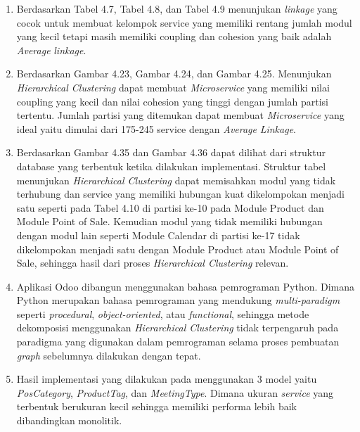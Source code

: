 \begin{enumerate}[nolistsep,leftmargin=0.5cm]
    \item Berdasarkan Tabel 4.7,  Tabel 4.8, dan Tabel 4.9 menunjukan \textit{linkage} yang cocok untuk membuat kelompok service yang memiliki rentang jumlah modul yang kecil tetapi masih memiliki coupling dan cohesion yang baik adalah \textit{Average} \textit{linkage}.
    \item Berdasarkan Gambar 4.23, Gambar 4.24,  dan Gambar 4.25. Menunjukan \textit{Hierarchical Clustering} dapat membuat \textit{Microservice} yang memiliki nilai coupling yang kecil dan nilai cohesion yang tinggi dengan jumlah partisi tertentu. Jumlah partisi yang ditemukan dapat membuat \textit{Microservice} yang ideal yaitu dimulai dari 175-245 service dengan \textit{Average} \textit{Linkage}. 
    \item Berdasarkan Gambar 4.35  dan Gambar 4.36 dapat dilihat dari struktur database yang terbentuk ketika dilakukan implementasi. Struktur tabel menunjukan \textit{Hierarchical Clustering} dapat memisahkan modul yang tidak terhubung dan service yang memiliki hubungan kuat dikelompokan menjadi satu seperti pada Tabel 4.10 di partisi ke-10 pada Module Product dan Module Point of Sale. Kemudian modul yang tidak memiliki hubungan dengan modul lain seperti Module Calendar di partisi ke-17 tidak dikelompokan menjadi satu dengan Module Product atau Module Point of Sale, sehingga hasil dari proses \textit{Hierarchical Clustering} relevan.
    \item Aplikasi Odoo dibangun menggunakan bahasa pemrograman Python. Dimana Python merupakan bahasa pemrograman yang mendukung  \textit{multi-paradigm} seperti \textit{procedural}, \textit{object-oriented}, atau \textit{functional}, sehingga  metode dekomposisi menggunakan \textit{Hierarchical Clustering} tidak terpengaruh pada paradigma yang digunakan dalam pemrograman selama proses pembuatan \textit{graph} sebelumnya dilakukan dengan tepat. 
    \item Hasil implementasi yang dilakukan pada menggunakan 3 model yaitu \textit{PosCategory}, \textit{ProductTag}, dan \textit{MeetingType}. Dimana ukuran \textit{service} yang terbentuk berukuran kecil sehingga memiliki performa lebih baik dibandingkan monolitik.\\
    
\end{enumerate}


